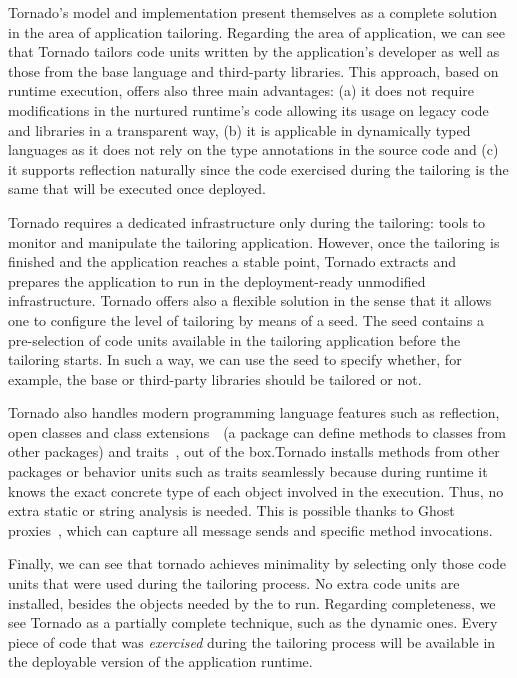 Tornado's model and implementation present themselves as a complete solution in the area of application tailoring. Regarding the area of application, we can see that Tornado tailors code units written by the application's developer as well as those from the base language and third-party libraries. This approach, based on runtime execution, offers also three main advantages: (a) it does not require modifications in the nurtured runtime's code allowing its usage on legacy code and libraries in a transparent way, (b) it is applicable in dynamically typed languages as it does not rely on the type annotations in the source code and (c) it supports reflection naturally since the code exercised during the tailoring is the same that will be executed once deployed.

Tornado requires a dedicated infrastructure only during the tailoring: tools to monitor and manipulate the tailoring application. However, once the tailoring is finished and the application reaches a stable point, Tornado extracts and prepares the application to run in the deployment-ready unmodified infrastructure. Tornado offers also a flexible solution in the sense that it allows one to configure the level of tailoring by means of a seed. The seed contains a pre-selection of code units available in the tailoring application before the tailoring starts. In such a way, we can use the seed to specify whether, for example, the base or third-party libraries should be tailored or not.

Tornado also handles modern programming language features such as reflection, open classes and class extensions~\cite{Berg03a}~(\ie a package can define methods to classes from other packages) and traits~\cite{Scha03a}, out of the box.Tornado installs methods from other packages or behavior units such as traits seamlessly because during runtime it knows the exact concrete type of each object involved in the execution. Thus, no extra static or string analysis is needed. This is possible thanks to Ghost proxies~\cite{Mart14z}, which can capture all message sends and specific method invocations.

Finally, we can see that tornado achieves minimality by selecting only those code units that were used during the tailoring process. No extra code units are installed, besides the objects needed by the \VM to run. Regarding completeness, we see Tornado as a partially complete technique, such as the dynamic ones. Every piece of code that was \emph{exercised} during the tailoring process will be available in the deployable version of the application runtime.

